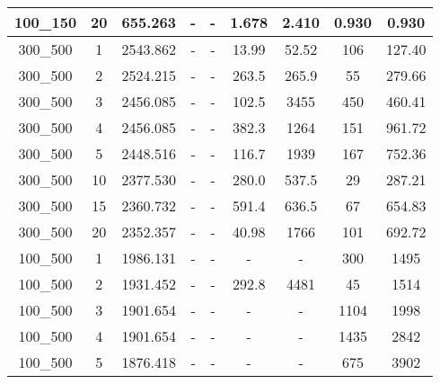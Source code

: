 \documentclass[10pt]{article}
\begin{document}
\begin{table}[h]
\begin{tabular}{ccc|cc|cc|cc}
{100\_150} & {20} & {655.263} & - & - & {1.678} & {2.410} & {0.930} & {0.930}\tabularnewline
\hline 
{300\_500} & {1} & {2543.862} & - & - & {13.99} & {52.52} & {106} & {127.40}\tabularnewline
{300\_500} & {2} & {2524.215} & - & - & {263.5} & {265.9} & {55} & {279.66}\tabularnewline
{300\_500} & {3} & {2456.085} & - & - & {102.5} & {3455} & {450} & {460.41}\tabularnewline
{300\_500} & {4} & {2456.085} & - & - & {382.3} & {1264} & {151} & {961.72}\tabularnewline
{300\_500} & {5} & {2448.516} & - & - & {116.7} & {1939} & {167} & {752.36}\tabularnewline
{300\_500} & {10} & {2377.530} & - & - & {280.0} & {537.5} & {29} & {287.21}\tabularnewline
{300\_500} & {15} & {2360.732} & - & - & {591.4} & {636.5} & {67} & {654.83}\tabularnewline
{300\_500} & {20} & {2352.357} & - & - & {40.98} & {1766} & {101} & {692.72}\tabularnewline
\hline 
{100\_500} & {1} & {1986.131} & - & - & - & - & {300} & {1495}\tabularnewline
{100\_500} & {2} & {1931.452} & - & - & {292.8} & {4481} & {45} & {1514}\tabularnewline
{100\_500} & {3} & {1901.654} & - & - & {-} & {-} & {1104} & {1998}\tabularnewline
{100\_500} & {4} & {1901.654} & - & - & {-} & {-} & {1435} & {2842}\tabularnewline
{100\_500} & {5} & {1876.418} & - & - & {-} & {-} & {675} & {3902}\tabularnewline
\end{tabular}
\end{table}
\end{document}
